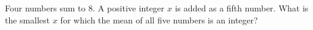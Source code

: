Four numbers sum to $8$. A positive integer $x$ is added as a fifth number. What is the smallest $x$ for which the mean of all five numbers is an integer?
